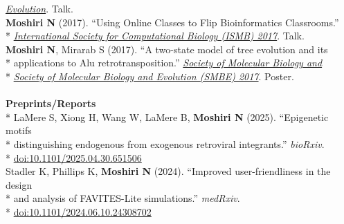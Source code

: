 \documentclass[margin,line]{res}
\begin{document}
\begin{resume}
\hspace*{8mm} \href{https://cme.ucsd.edu/hivdynamics/}{\textit{Evolution}}. Talk.\\
\hspace*{4mm} \textbf{Moshiri N} (2017). ``Using Online Classes to Flip Bioinformatics Classrooms.''\\*\vspace{2mm}
\hspace*{8mm} \href{https://www.iscb.org/cms_addon/conferences/ismbeccb2017/technologytrack.php}{\textit{International Society for Computational Biology (ISMB) 2017}}. Talk.\\
\hspace*{4mm} \textbf{Moshiri N}, Mirarab S (2017). ``A two-state model of tree evolution and its\\*
\hspace*{9.5mm} applications to Alu retrotransposition.'' \href{https://smbe.org/smbe/}{\textit{Society of Molecular Biology and}}\\*\vspace{2mm}
\hspace*{8mm} \href{https://smbe.org/smbe/}{\textit{Society of Molecular Biology and Evolution (SMBE) 2017}}. Poster.\\
~\\
\textbf{Preprints/Reports}\vspace{2mm}\\*
\hspace*{4mm} LaMere S, Xiong H, Wang W, LaMere B, \textbf{Moshiri N} (2025). ``Epigenetic motifs\\*
\hspace*{9.5mm} distinguishing endogenous from exogenous retroviral integrants.'' \textit{bioRxiv}.\\*\vspace{2mm}
\hspace*{8mm} \href{https://doi.org/10.1101/2025.04.30.651506}{doi:10.1101/2025.04.30.651506}\\
\hspace*{4mm} Stadler K, Phillips K, \textbf{Moshiri N} (2024). ``Improved user-friendliness in the design\\*
\hspace*{9.5mm} and analysis of FAVITES-Lite simulations.'' \textit{medRxiv}.\\*\vspace{2mm}
\hspace*{8mm} \href{https://doi.org/10.1101/2024.06.10.24308702}{doi:10.1101/2024.06.10.24308702}\\

\end{resume}
\end{document}
